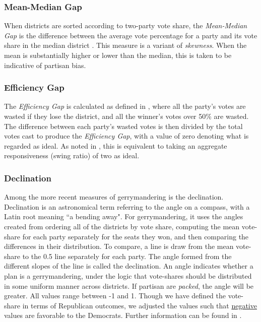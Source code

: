         \subsubsection*{Mean-Median Gap}
    When districts are sorted according to two-party vote share, the \textit{Mean-Median Gap} is the difference between the average vote percentage for a party and its vote share in the median district \citep[see][]{Best2018}. This measure is a variant of \textit{skewness}. When the mean is substantially higher or lower than the median, this is taken to be indicative of partisan bias.
\par
        \subsubsection*{Efficiency Gap}
    The \textit{Efficiency Gap} is calculated as defined in \citet{Stephanopoulos2014_UofChicagoLaw}, where all the party’s votes are wasted if they lose the district, and all the winner’s votes over 50\% are wasted. The difference between each party’s wasted votes is then divided by the total votes cast to produce the \textit{Efficiency Gap}, with a value of zero denoting what is regarded as ideal. As noted in \citet[][p. 13]{Best2018}, this is equivalent to taking an aggregate responsiveness (swing ratio) of two as ideal. 
\par
        \subsubsection*{Declination}
    Among the more recent measures of gerrymandering is the declination. Declination is an astronomical term referring to the angle on a compass, with a Latin root meaning ``a bending away". For gerrymandering, it uses the angles created from ordering all of the districts by vote share, computing the mean vote-share for each party separately for the seats they won, and then comparing the differences in their distribution. To compare, a line is draw from the mean vote-share to the 0.5 line separately for each party. The angle formed from the different slopes of the line is called the declination. An angle indicates whether a plan is a gerrymandering, under the logic that vote-shares should be distributed in some uniform manner across districts. If partisan are \textit{packed}, the angle will be greater. All values range between -1 and 1. Though we have defined the vote-share in terms of Republican outcomes, we adjusted the values such that \underline{negative} values are favorable to the Democrats. Further information can be found in \citet{Warrington2018}.  
\par

